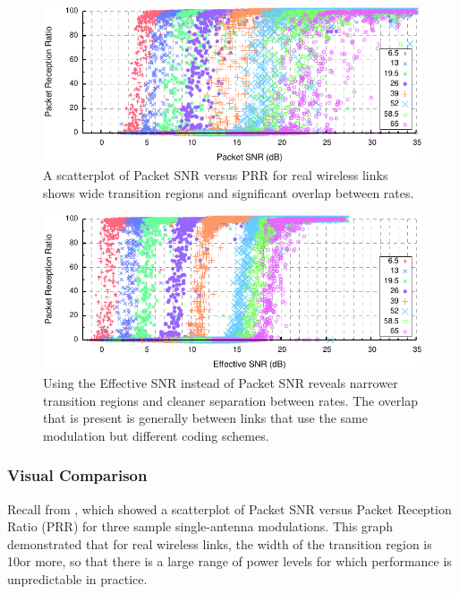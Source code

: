 \begin{figure}[t!]
	\centering
	\includegraphics[width=\textwidth]{figures/delivery_figures/snr_prr_scatter_siso.pdf}
	\caption[SNR vs PRR for all SISO modulations]{\label{fig:snr_prr_siso} A scatterplot of Packet SNR versus PRR for real wireless links shows wide transition regions and significant overlap between rates.}
\end{figure}
\begin{figure}[t!]
	\centering
	\includegraphics[width=\textwidth]{figures/delivery_figures/esnr_prr_scatter_siso.pdf}
	\caption[Effective SNR vs PRR for all SISO modulations]{\label{fig:esnr_prr_siso}Using the Effective SNR instead of Packet SNR reveals narrower transition regions and cleaner separation between rates. The overlap that is present is generally between links that use the same modulation but different coding schemes.}
\end{figure}

\subsubsection{Visual Comparison}
Recall  from , which showed a scatterplot of Packet SNR versus Packet Reception Ratio (PRR) for three sample single-antenna modulations. This graph demonstrated that for real wireless links, the width of the transition region is 10\dB or more, so that there is a large range of power levels for which performance is unpredictable in practice.

